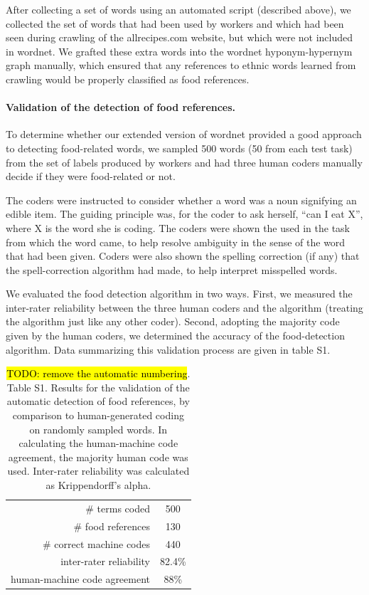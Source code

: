 \documentclass[12pt]{article}
\newcommand{\td}[1]{{\color{blu}\hl{TODO: #1}}}
\begin{document}
After collecting a set of words using an automated script 
(described above), we collected the set of words that had been used by
workers and which had been seen during crawling of the allrecipes.com website,
but which were not included in wordnet.  We grafted these extra words into
the wordnet hyponym-hypernym graph manually, which ensured that any references
to ethnic words learned from crawling would be properly classified as 
food references.

\paragraph{Validation of the detection of food references.}
To determine whether our extended version of wordnet provided a good approach
to detecting food-related words, we sampled 500 words 
(50 from each test task)  from the set of labels produced by workers and had 
three human coders manually decide if they were 
food-related or not.

The coders were instructed to consider whether a word was a noun signifying
an edible item.  The guiding principle was, for the coder to ask herself,
``can I eat X'', where X is the word she is coding.  The coders were
shown the used in the task from which the word came, to help resolve ambiguity
in the sense of the word that had been given.  Coders were also shown the 
spelling correction (if any) that the spell-correction algorithm had made,
to help interpret misspelled words.

We evaluated the food detection algorithm in two ways.  First, we measured
the inter-rater reliability between the three human coders and the algorithm
(treating the algorithm just like any other coder).  Second, adopting the 
majority code given by the human coders, we determined the accuracy of the
food-detection algorithm.  Data summarizing this validation process are given
in table S1.

\begin{table}
\centering
\setlength{\tabcolsep}{12pt}
\begin{tabular}{ r | c }
\toprule    
\# terms coded & 500 \\
\# food references & 130 \\
\# correct machine codes & 440 \\
inter-rater reliability & 82.4\% \\
human-machine code agreement & 88\% \\
\bottomrule
\end{tabular}
\caption{\footnotesize{
	\td{remove the automatic numbering}. Table S1. Results for the validation 
	of the automatic detection of food references, by comparison to
	human-generated coding on randomly sampled words.  In calculating the 
	human-machine code agreement, the majority human code was used.
	Inter-rater reliability was calculated as Krippendorff's alpha.
}}
\end{table}
\end{document}
